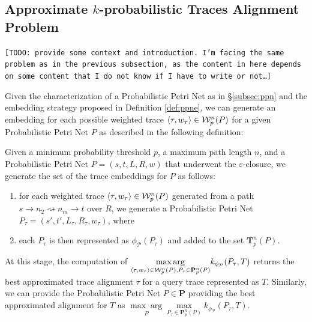 \subsection{Approximate $k$-probabilistic Traces Alignment Problem}\label{subsec:akptap}
\texttt{\color{red}[TODO: provide some context and introduction. I'm facing the same problem as in the previous subsection, as the content in here depends on some content that I do not know if I have to write or not\dots]}

Given the characterization of a Probabilistic Petri Net as in \S\ref{subsec:ppn} and the embedding strategy proposed in Definition \ref{def:ppne}, we can generate an embedding for each possible weighted trace $\braket{\tau,w_\tau}\in\mathcal{W}_p^n(P)$ for a given Probabilistic Petri Net $P$ as described in the following definition:
\begin{definition}
Given a minimum probability threshold $p$, a maximum path length $n$, and a Probabilistic Petri Net $P=(s,t,L,R,w)$ that underwent the $\varepsilon$-closure, we generate the set of the trace embeddings for $P$ as follows:
\begin{enumerate}
	\item for each weighted trace $\braket{\tau,w_\tau}\in\mathcal{W}_p^n(P)$ generated from a path $s\to n_2\rightsquigarrow n_m\to t$ over $R$, we generate a Probabilistic Petri Net $P_\tau=(s',t',L_\tau,R_\tau,w_\tau)$, where 
	\item each $P_\tau$ is then represented as $\phi_{\mathcal{P}}(P_\tau)$ and added to the set $\mathbf{T}_p^n(P)$.
\end{enumerate}
\end{definition}

At this stage, the computation of $\underset{\braket{\tau,w_\tau}\in \mathcal{W}_p^n(P), P_\tau\in\mathbf{P}_p^n(P)}{\max\arg} k_{\phi_\mathcal{P}}(P_\tau, T)$ returns the best approximated trace alignment $\tau$ for a query trace represented as $T$. Similarly, we can provide the Probabilistic Petri Net $P\in\mathbf{P}$ providing the best approximated alignment for $T$ as $\underset{P}{\max\arg}\underset{ P_\tau\in\mathbf{P}_p^n(P)}{\max} k_{\phi_\mathcal{P}}(P_\tau, T)$. 

